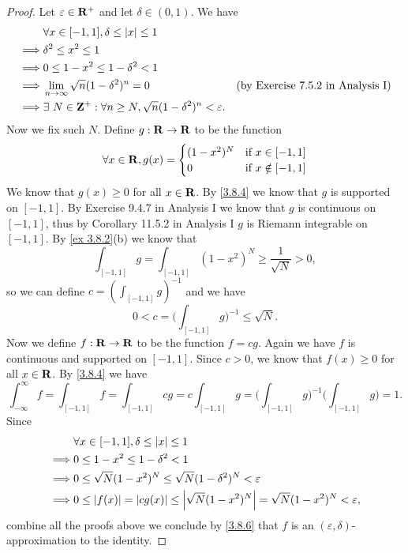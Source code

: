 \begin{proof}
  Let \(\varepsilon \in \mathbf{R}^+\) and let \(\delta \in (0, 1)\).
  We have
  \begin{align*}
             & \forall x \in [-1, 1], \delta \leq \left\lvert x\right\rvert \leq 1                                                                           \\
    \implies & \delta^2 \leq x^2 \leq 1                                                                                                    \\
    \implies & 0 \leq 1 - x^2 \leq 1 - \delta^2 < 1                                                                                        \\
    \implies & \lim_{n \to \infty} \sqrt{n} (1 - \delta^2)^n = 0                                & \text{(by Exercise 7.5.2 in Analysis I)} \\
    \implies & \exists\ N \in \mathbf{Z}^+ : \forall n \geq N, \sqrt{n} (1 - \delta^2)^n < \varepsilon.
  \end{align*}
  Now we fix such \(N\).
  Define \(g : \mathbf{R} \to \mathbf{R}\) to be the function
  \[
    \forall x \in \mathbf{R}, g(x) = \begin{cases}
      (1 - x^2)^N & \text{if } x \in [-1, 1]    \\
      0           & \text{if } x \notin [-1, 1]
    \end{cases}
  \]
  We know that \(g(x) \geq 0\) for all \(x \in \mathbf{R}\).
  By \cref{3.8.4} we know that \(g\) is supported on \([-1, 1]\).
  By Exercise 9.4.7 in Analysis I we know that \(g\) is continuous on \([-1, 1]\), thus by Corollary 11.5.2 in Analysis I \(g\) is Riemann integrable on \([-1, 1]\).
  By \cref{ex 3.8.2}(b) we know that
  \[
    \int_{[-1, 1]} g = \int_{[-1, 1]} (1 - x^2)^N \geq \frac{1}{\sqrt{N}} > 0,
  \]
  so we can define \(c = (\int_{[-1, 1]} g)^{-1}\) and we have
  \[
    0 < c = \bigg(\int_{[-1, 1]} g\bigg)^{-1} \leq \sqrt{N}.
  \]
  Now we define \(f : \mathbf{R} \to \mathbf{R}\) to be the function \(f = cg\).
  Again we have \(f\) is continuous and supported on \([-1, 1]\).
  Since \(c > 0\), we know that \(f(x) \geq 0\) for all \(x \in \mathbf{R}\).
  By \cref{3.8.4} we have
  \[
    \int_{-\infty}^\infty f = \int_{[-1, 1]} f = \int_{[-1, 1]} cg = c \int_{[-1, 1]} g = \bigg(\int_{[-1, 1]} g\bigg)^{-1} \bigg(\int_{[-1, 1]} g\bigg) = 1.
  \]
  Since
  \begin{align*}
             & \forall x \in [-1, 1], \delta \leq \left\lvert x\right\rvert \leq 1                                                     \\
    \implies & 0 \leq 1 - x^2 \leq 1 - \delta^2 < 1                                                                  \\
    \implies & 0 \leq \sqrt{N} (1 - x^2)^N \leq \sqrt{N} (1 - \delta^2)^N < \varepsilon                              \\
    \implies & 0 \leq \left\lvert f(x)\right\rvert = \left\lvert cg(x)\right\rvert \leq \left\lvert\sqrt{N} (1 - x^2)^N\right\rvert = \sqrt{N} (1 - x^2)^N < \varepsilon,
  \end{align*}
  combine all the proofs above we conclude by \cref{3.8.6} that \(f\) is an \((\varepsilon, \delta)\)-approximation to the identity.
\end{proof}


